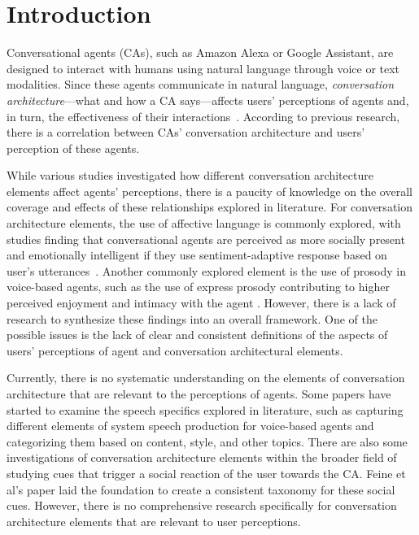 
\section{Introduction}

Conversational agents (CAs), such as Amazon Alexa or Google Assistant, are designed to interact with humans using natural language through voice or text modalities. Since these agents communicate in natural language, \textit{conversation architecture}---what and how a CA says---affects users' perceptions of agents and, in turn, the effectiveness of their interactions~\cite{knijnenburg2016inferring, seeger2021chatbots}. According to previous research, there is a correlation between CAs' conversation architecture and users' perception of these agents.

While various studies investigated how different conversation architecture elements affect agents' perceptions, there is a paucity of knowledge on the overall coverage and effects of these relationships explored in literature. For conversation architecture elements, the use of affective language is commonly explored, with studies finding that conversational agents are perceived as more socially present and emotionally intelligent if they use sentiment-adaptive response based on user's utterances~\cite{diederich2019emulating, yang2017perceived}. Another commonly explored element is the use of prosody in voice-based agents, such as the use of express prosody contributing to higher perceived enjoyment and intimacy with the agent \cite{kim2020can}. However, there is a lack of research to synthesize these findings into an overall framework. One of the possible issues is the lack of clear and consistent definitions of the aspects of users' perceptions of agent and conversation architectural elements.

Currently, there is no systematic understanding on the elements of conversation architecture that are relevant to the perceptions of agents. Some papers have started to examine the speech specifics explored in literature, such as \citet{clark2019state} capturing different elements of system speech production for voice-based agents and categorizing them based on content, style, and other topics. There are also some investigations of conversation architecture elements within the broader field of studying cues that trigger a social reaction of the user towards the CA. Feine et al's \cite{feine2019taxonomy} paper laid the foundation to create a consistent taxonomy for these social cues. However, there is no comprehensive research specifically for conversation architecture elements that are relevant to user perceptions. 

